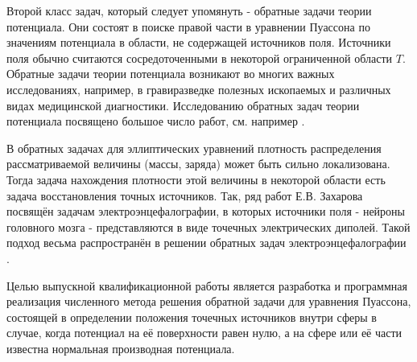Второй класс задач, который следует упомянуть - обратные задачи теории потенциала. Они состоят в поиске правой части в уравнении Пуассона по значениям потенциала в области, не содержащей источников поля. Источники поля обычно считаются сосредоточенными в некоторой ограниченной области $T$. Обратные задачи теории потенциала возникают во многих важных исследованиях, например, в гравиразведке полезных ископаемых и различных видах медицинской диагностики. Исследованию обратных задач теории потенциала посвящено большое число работ, см. например \cite{novikov, prilepko, sretenskiy}.

В обратных задачах для эллиптических уравнений плотность распределения рассматриваемой величины (массы, заряда) может быть сильно локализована. Тогда задача нахождения плотности этой величины в некоторой области есть задача восстановления точных источников. Так, ряд работ Е.В. Захарова \cite{zakh_1, zakh_2} посвящён задачам электроэнцефалографии, в которых источники поля - нейроны головного мозга - представляются в виде точечных электрических диполей. Такой подход весьма распространён в решении обратных задач электроэнцефалографии \cite{gnezditskiy}.

Целью выпускной квалификационной работы является разработка и программная реализация численного метода решения обратной задачи для уравнения Пуассона, состоящей в определении положения точечных источников внутри сферы в случае, когда потенциал на её поверхности равен нулю, а на сфере или её части известна нормальная производная потенциала. 